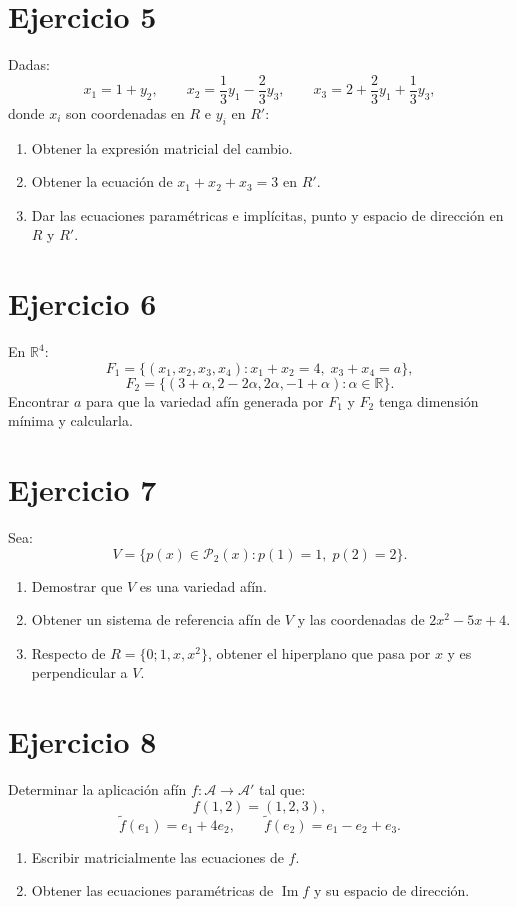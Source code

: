 \documentclass[11pt,a4paper]{article}
\newcommand{\R}{\mathbb{R}}
\newcommand{\Ima}{\operatorname{Im}}
\begin{document}
\section{Ejercicio 5}
Dadas:
\[
x_1=1+y_2,\qquad
x_2=\frac13y_1-\frac23y_3,\qquad
x_3=2+\frac23y_1+\frac13y_3,
\]
donde $x_i$ son coordenadas en $R$ e $y_i$ en $R'$:
\begin{enumerate}[label=\alph*)]
\item Obtener la expresión matricial del cambio.
\item Obtener la ecuación de $x_1+x_2+x_3=3$ en $R'$.
\item Dar las ecuaciones paramétricas e implícitas, punto y espacio de dirección en $R$ y $R'$.
\end{enumerate}

\section{Ejercicio 6}
En $\R^4$:
\[
F_1=\{(x_1,x_2,x_3,x_4):x_1+x_2=4,\;x_3+x_4=a\},
\]
\[
F_2=\{(3+\alpha,2-2\alpha,2\alpha,-1+\alpha):\alpha\in\R\}.
\]
Encontrar $a$ para que la variedad afín generada por $F_1$ y $F_2$ tenga dimensión mínima y calcularla.

\section{Ejercicio 7}
Sea:
\[
V=\{p(x)\in\mathcal P_2(x):p(1)=1,\;p(2)=2\}.
\]
\begin{enumerate}[label=\alph*)]
\item Demostrar que $V$ es una variedad afín.
\item Obtener un sistema de referencia afín de $V$ y las coordenadas de $2x^2-5x+4$.
\item Respecto de $R=\{0;1,x,x^2\}$, obtener el hiperplano que pasa por $x$ y es perpendicular a $V$.
\end{enumerate}

\section{Ejercicio 8}
Determinar la aplicación afín $f:\mathcal A\to\mathcal A'$ tal que:
\[
f(1,2)=(1,2,3),
\]
\[
\widetilde f(e_1)=e_1+4e_2,
\qquad
\widetilde f(e_2)=e_1-e_2+e_3.
\]
\begin{enumerate}[label=\alph*)]
\item Escribir matricialmente las ecuaciones de $f$.
\item Obtener las ecuaciones paramétricas de $\Ima f$ y su espacio de dirección.
\end{enumerate}
\end{document}
